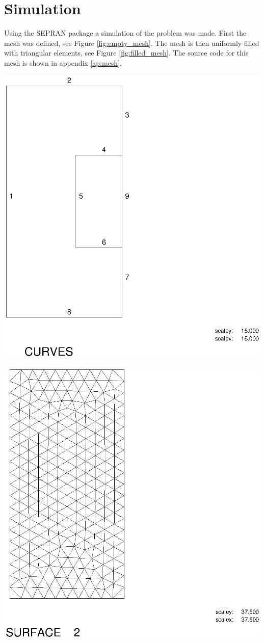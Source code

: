 \section{Simulation}
Using the SEPRAN package a simulation of the problem was made. First the mesh was defined, see Figure \ref{fig:empty_mesh}. The mesh is then uniformly filled with triangular elements, see Figure \ref{fig:filled_mesh}. The source code for this mesh is shown in appendix \ref{ap:mesh}.
\begin{Figure}
 \centerfloat
 \includegraphics[width=0.4\linewidth, trim=1cm 2cm 7cm 0.5cm, clip]{empty_mesh.eps}
 \label{fig:empty_mesh}
\end{Figure}

\begin{Figure}
 \centerfloat
 \includegraphics[width=0.4\linewidth, trim=1.5cm 2cm 7.5cm 0.5cm, clip]{filled_mesh.eps}
 \label{fig:filled_mesh}
\end{Figure}

